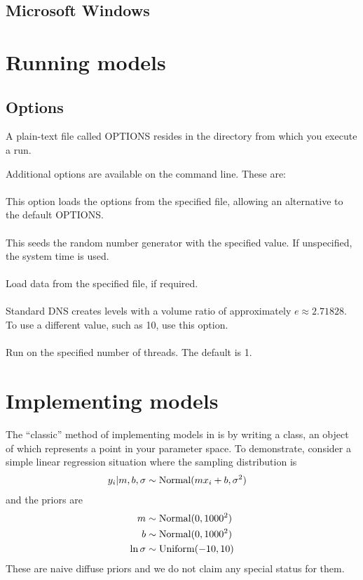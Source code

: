 \documentclass[article]{jss}
\begin{document}
\subsection{Microsoft Windows}



\section{Running models}


\subsection{Options}
A plain-text file called OPTIONS resides in the directory from which you
execute a run.

Additional options are available on the command line. These are:\\

\\
This option loads the  options from the specified file, allowing
an alternative to the default OPTIONS.\\

\\
This seeds the random number generator with the specified value. If unspecified, the system time is used.\\

\\
Load data from the specified file, if required.\\

\\
Standard DNS creates levels with a volume ratio of approximately
$e\approx 2.71828$. To use a different value, such as 10, use this option.\\

\\
Run on the specified number of threads. The default is 1.

\section{Implementing models}\label{sec:models}
The ``classic'' method of implementing models in  is by
writing a  class, an object of which represents a
point in your parameter space.
To demonstrate, consider a simple linear regression situation where the
sampling distribution is
\begin{align}
y_i | m, b, \sigma &\sim \textnormal{Normal}(mx_i + b, \sigma^2)
\end{align}
and the priors are
\begin{align}
m &\sim \textnormal{Normal}(0, 1000^2)\\
b &\sim \textnormal{Normal}(0, 1000^2)\\
\ln\sigma &\sim \textnormal{Uniform}(-10, 10)
\end{align}
These are naive diffuse priors and we do not claim any special status for them.
\end{document}

